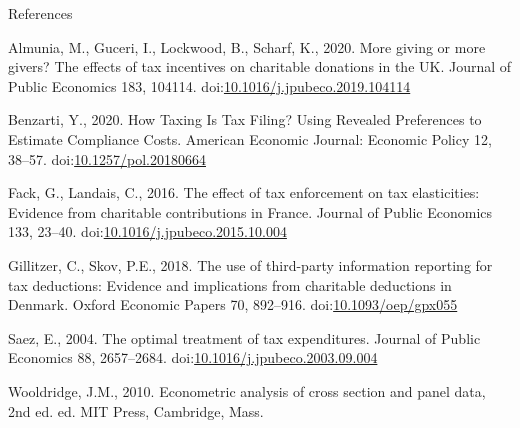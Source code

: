 \documentclass[
  ignorenonframetext,
  aspectratio=169,
]{beamer}
\newlength{\cslhangindent}
\newlength{\cslentryspacingunit} %
\newenvironment{CSLReferences}[2] %
 {%
  \setlength{\parindent}{0pt}
  \ifodd #1
  \let\oldpar\par
  \def\par{\hangindent=\cslhangindent\oldpar}
  \fi
  \setlength{\parskip}{#2\cslentryspacingunit}
 }%
 {}
\begin{document}
\begin{frame}{References}
\hypertarget{refs}{}
\begin{CSLReferences}{1}{0}
\leavevmode{}%
Almunia, M., Guceri, I., Lockwood, B., Scharf, K., 2020. More giving or more givers? {The} effects of tax incentives on charitable donations in the {UK}. Journal of Public Economics 183, 104114. doi:\href{https://doi.org/10.1016/j.jpubeco.2019.104114}{10.1016/j.jpubeco.2019.104114}

\leavevmode{}%
Benzarti, Y., 2020. How {Taxing Is Tax Filing}? {Using Revealed Preferences} to {Estimate Compliance Costs}. American Economic Journal: Economic Policy 12, 38--57. doi:\href{https://doi.org/10.1257/pol.20180664}{10.1257/pol.20180664}

\leavevmode{}%
Fack, G., Landais, C., 2016. The effect of tax enforcement on tax elasticities: {Evidence} from charitable contributions in {France}. Journal of Public Economics 133, 23--40. doi:\href{https://doi.org/10.1016/j.jpubeco.2015.10.004}{10.1016/j.jpubeco.2015.10.004}

\leavevmode{}%
Gillitzer, C., Skov, P.E., 2018. The use of third-party information reporting for tax deductions: Evidence and implications from charitable deductions in {Denmark}. Oxford Economic Papers 70, 892--916. doi:\href{https://doi.org/10.1093/oep/gpx055}{10.1093/oep/gpx055}

\leavevmode{}%
Saez, E., 2004. The optimal treatment of tax expenditures. Journal of Public Economics 88, 2657--2684. doi:\href{https://doi.org/10.1016/j.jpubeco.2003.09.004}{10.1016/j.jpubeco.2003.09.004}

\leavevmode{}%
Wooldridge, J.M., 2010. Econometric analysis of cross section and panel data, 2nd ed. ed. {MIT Press}, {Cambridge, Mass}.

\end{CSLReferences}
\end{frame}
\end{document}
